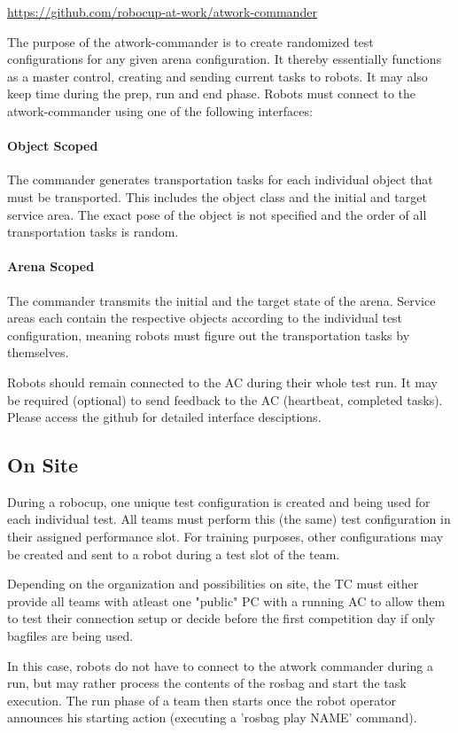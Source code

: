 \begin{center}
	\url{https://github.com/robocup-at-work/atwork-commander}
\end{center}

The purpose of the atwork-commander is to create randomized test configurations for any given arena configuration.
It thereby essentially functions as a master control, creating and sending current tasks to robots.
It may also keep time during the prep, run and end phase.
Robots must connect to the atwork-commander using one of the following interfaces:

\paragraph{Object Scoped}
The commander generates transportation tasks for each individual object that must be transported.
This includes the object class and the initial and target service area.
The exact pose of the object is not specified and the order of all transportation tasks is random.

\paragraph{Arena Scoped}
The commander transmits the initial and the target state of the arena.
Service areas each contain the respective objects according to the individual test configuration,
meaning robots must figure out the transportation tasks by themselves.

Robots should remain connected to the AC during their whole test run.
It may be required (optional) to send feedback to the AC (heartbeat, completed tasks).
Please access the github for detailed interface desciptions.

\subsection{On Site}

During a robocup, one unique test configuration is created and being used for each individual test.
All teams must perform this (the same) test configuration in their assigned performance slot.
For training purposes, other configurations may be created and sent to a robot during a test slot of the team.

Depending on the organization and possibilities on site, the TC must either provide all teams with atleast one "public" PC with a running AC to allow them to test their connection setup or decide before the first competition day if only bagfiles are being used.

In this case, robots do not have to connect to the atwork commander during a run, but may rather process the contents of the rosbag and start the task execution.
The run phase of a team then starts once the robot operator announces his starting action (executing a 'rosbag play NAME' command). 



